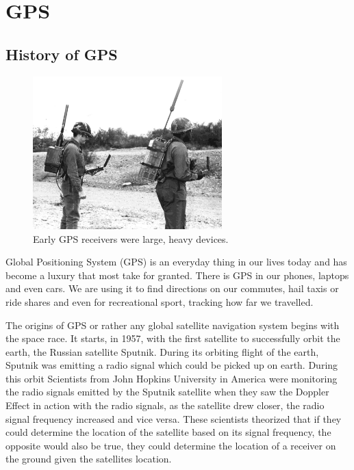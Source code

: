 \section{GPS}
\subsection{History of GPS}
\begin{figure}
	\begin{center}
		\includegraphics[width = 0.65\textwidth]{figures/historyGPS.jpg}
		\caption{Early GPS receivers were large, heavy devices. \cite{USAF1978}}
		\label{fig:2:histGPS}
	\end{center}
\end{figure}
Global Positioning System (GPS) is an everyday thing in our lives today and has become a luxury that most take for granted. There is GPS in our phones, laptops and even cars. We are using it to find directions on our commutes, hail taxis or ride shares and even for recreational sport, tracking how far we travelled.\par
\vspace{0.6cm}
The origins of GPS or rather any global satellite navigation system begins with the space race. It starts, in 1957, with the first satellite to successfully orbit the earth, the Russian satellite Sputnik. During its orbiting flight of the earth, Sputnik was emitting a radio signal which could be picked up on earth. During this orbit Scientists from John Hopkins University in America were monitoring the radio signals emitted by the Sputnik satellite when they saw the Doppler Effect in action with the radio signals, as the satellite drew closer, the radio signal frequency increased and vice versa. These scientists theorized that if they could determine the location of the satellite based on its signal frequency, the opposite would also be true, they could determine the location of a receiver on the ground given the satellites location. \cite{Aerospace2021}\par
